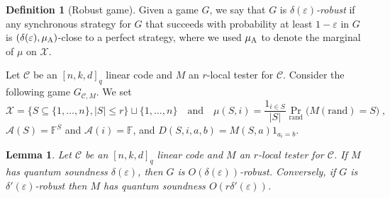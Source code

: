\documentclass[11pt]{article}
\newtheorem{lemma}[theorem]{Lemma}
\theoremstyle{definition}
\newtheorem{definition}[theorem]{Definition}
\newcommand{\code}{\mathcal{C}}
\newcommand{\field}{\mathbb{F}}
\newcommand{\mA}{\ensuremath{\mathcal{A}}}
\newcommand{\mX}{\ensuremath{\mathcal{X}}}
\newcommand{\rand}{\textrm{rand}}
\newcommand{\eps}{\varepsilon}
\newcommand{\labelstyle}[1]{\ensuremath{\textsc{#1}}\xspace}
\newcommand{\alice}{\labelstyle{A}}
\begin{document}
\begin{definition}[Robust game]
Given a game $G$, we say that $G$ is \emph{$\delta(\eps)$-robust} if any synchronous strategy for $G$ that succeeds with probability at least $1-\eps$ in $G$ is $(\delta(\eps),\mu_\alice)$-close to a perfect strategy, where we used $\mu_\alice$ to denote the marginal of $\mu$ on $\mX$.  
\end{definition}

Let $\code$ be an $[n,k,d]_q$ linear code and $M$ an $r$-local tester for $\code$. Consider the following game $G_{\code,M}$. We set 
\[\mX = \{ S\subseteq \{1,\ldots,n\},|S|\leq r\} \sqcup\{1,\ldots,n\}\quad\text{and}\quad \mu(S,i)=\frac{1_{i\in S}}{|S|}\Pr_\rand\big(M(\rand)=S\big)\;,\]
$\mA(S)=\field^S$ and $\mA(i)=\field$, and $D(S,i,a,b)=M(S,a)1_{a_i=b}$. 


\begin{lemma}\label{lem:sound-game}
Let $\code$ be an $[n,k,d]_q$ linear code and $M$ an $r$-local tester for $\code$. 
If $M$ has quantum soundness $\delta(\eps)$, then $G$ is $O(\delta(\eps))$-robust. Conversely, if $G$ is $\delta'(\eps)$-robust then $M$ has quantum soundness $O(r\delta'(\eps))$. 
\end{lemma}
\end{document}
